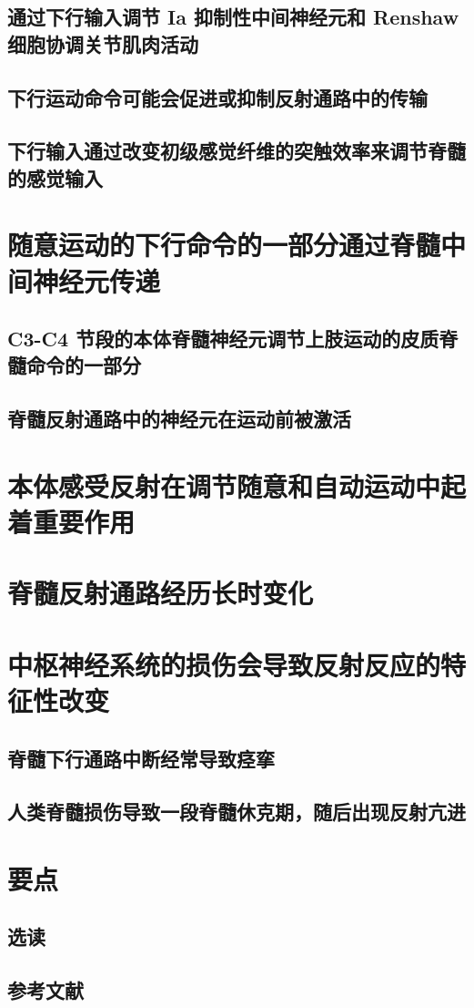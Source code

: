 \subsection{通过下行输入调节 Ia 抑制性中间神经元和 Renshaw 细胞协调关节肌肉活动}
\subsection{下行运动命令可能会促进或抑制反射通路中的传输}
\subsection{下行输入通过改变初级感觉纤维的突触效率来调节脊髓的感觉输入}

\section{随意运动的下行命令的一部分通过脊髓中间神经元传递}
\subsection{C3-C4 节段的本体脊髓神经元调节上肢运动的皮质脊髓命令的一部分}
\subsection{脊髓反射通路中的神经元在运动前被激活}

\section{本体感受反射在调节随意和自动运动中起着重要作用}

\section{脊髓反射通路经历长时变化}

\section{中枢神经系统的损伤会导致反射反应的特征性改变}
\subsection{脊髓下行通路中断经常导致痉挛}
\subsection{人类脊髓损伤导致一段脊髓休克期，随后出现反射亢进}


\section{要点}
\subsection{选读}
\subsection{参考文献}